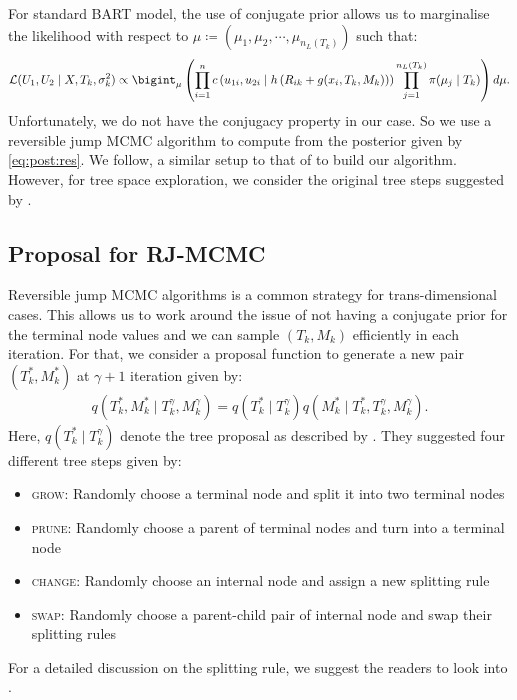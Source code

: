 \documentclass{amsart}
\begin{document}
For standard BART model, the use of conjugate prior allows us to marginalise the likelihood with respect to $\mu\coloneqq\left(\mu_1,\mu_2,\cdots,\mu_{n_L(T_k)}\right)$ such that:
\begin{equation*}
	\mathcal{L}(U_1,U_2\mid X, T_k, \sigma^2_{k})\propto \bigint_{\mu}\left(\prod_{i=1}^{n}c\left(u_{1i},u_{2i}\mid h\left(R_{ik}+g(x_i, T_k, M_k)\right)\right)\prod_{j=1}^{n_L(T_k)}\pi(\mu_j\mid T_k)\right)d\mu.
\end{equation*}
Unfortunately, we do not have the conjugacy property in our case. So we use a reversible jump MCMC algorithm \cite{green_RJMCMC} to compute from the posterior given by \cref{eq:post:res}. We follow, a similar setup to that of \citet{Linero02012025} to build our algorithm. However, for tree space exploration, we consider the original tree steps suggested by \cite{chipman98BCART}.

\subsection{Proposal for RJ-MCMC}

Reversible jump MCMC algorithms is a common strategy for trans-dimensional cases. This allows us to work around the issue of not having a conjugate prior for the terminal node values and we can sample $(T_k,M_k)$ efficiently in each iteration. For that, we consider a proposal function to generate a new pair $\left(T_k^\ast, M_k^\ast\right)$ at $\gamma+1$ iteration given by:
\begin{align}\label{eq:prop}
	q\left(T_k^\ast, M_k^\ast \mid T_k^{\gamma},M_k^{\gamma}\right) = q\left( T_k^\ast\mid T_k^{\gamma}\right) q\left(M_k^\ast\mid T_k^\ast, T_k^{\gamma}, M_k^{\gamma}\right).
\end{align}
Here, $q\left( T_k^\ast\mid T_k^{\gamma}\right)$ denote the tree proposal as described by \citet{chipman98BCART}. They suggested four different tree steps given by:
\begin{itemize}
	\item \textsc{grow}: Randomly choose a terminal node and split it into two terminal nodes
	\item \textsc{prune}: Randomly choose a parent of terminal nodes and turn into a terminal node
	\item \textsc{change}: Randomly choose an internal node and assign a new splitting rule
	\item \textsc{swap}: Randomly choose a parent-child pair of internal node and swap their splitting rules
\end{itemize}
For a detailed discussion on the splitting rule, we suggest the readers to look into \citet{chipman98BCART}. 
\end{document}
